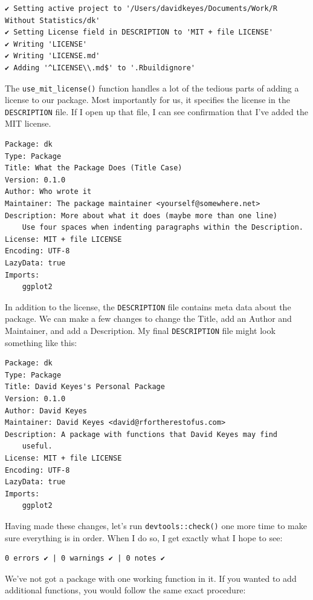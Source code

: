 \documentclass[
]{book}
\begin{document}
\begin{verbatim}
✔ Setting active project to '/Users/davidkeyes/Documents/Work/R Without Statistics/dk'
✔ Setting License field in DESCRIPTION to 'MIT + file LICENSE'
✔ Writing 'LICENSE'
✔ Writing 'LICENSE.md'
✔ Adding '^LICENSE\\.md$' to '.Rbuildignore'
\end{verbatim}

The \texttt{use\_mit\_license()} function handles a lot of the tedious parts of adding a license to our package. Most importantly for us, it specifies the license in the \texttt{DESCRIPTION} file. If I open up that file, I can see confirmation that I've added the MIT license.

\begin{verbatim}
Package: dk
Type: Package
Title: What the Package Does (Title Case)
Version: 0.1.0
Author: Who wrote it
Maintainer: The package maintainer <yourself@somewhere.net>
Description: More about what it does (maybe more than one line)
    Use four spaces when indenting paragraphs within the Description.
License: MIT + file LICENSE
Encoding: UTF-8
LazyData: true
Imports:
    ggplot2
\end{verbatim}

In addition to the license, the \texttt{DESCRIPTION} file contains meta data about the package. We can make a few changes to change the Title, add an Author and Maintainer, and add a Description. My final \texttt{DESCRIPTION} file might look something like this:

\begin{verbatim}
Package: dk
Type: Package
Title: David Keyes's Personal Package
Version: 0.1.0
Author: David Keyes
Maintainer: David Keyes <david@rfortherestofus.com>
Description: A package with functions that David Keyes may find 
    useful.
License: MIT + file LICENSE
Encoding: UTF-8
LazyData: true
Imports:
    ggplot2
\end{verbatim}

Having made these changes, let's run \texttt{devtools::check()} one more time to make sure everything is in order. When I do so, I get exactly what I hope to see:

\begin{verbatim}
0 errors ✔ | 0 warnings ✔ | 0 notes ✔
\end{verbatim}

We've not got a package with one working function in it. If you wanted to add additional functions, you would follow the same exact procedure:
\end{document}
